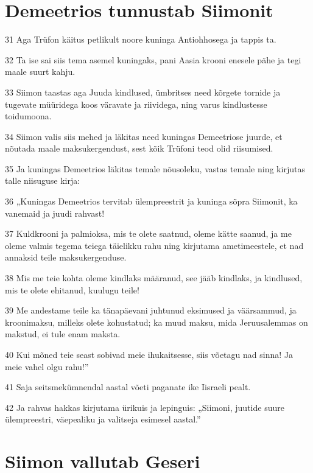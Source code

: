 \section*{Demeetrios tunnustab Siimonit}

\par 31 Aga Trüfon käitus petlikult noore kuninga Antiohhosega ja tappis ta.
\par 32 Ta ise sai siis tema asemel kuningaks, pani Aasia krooni enesele pähe ja tegi maale suurt kahju.
\par 33 Siimon taastas aga Juuda kindlused, ümbritses need kõrgete tornide ja tugevate müüridega koos väravate ja riividega, ning varus kindlustesse toidumoona.
\par 34 Siimon valis siis mehed ja läkitas need kuningas Demeetriose juurde, et nõutada maale maksukergendust, sest kõik Trüfoni teod olid riisumised.
\par 35 Ja kuningas Demeetrios läkitas temale nõusoleku, vastas temale ning kirjutas talle niisuguse kirja:
\par 36 „Kuningas Demeetrios tervitab ülempreestrit ja kuninga sõpra Siimonit, ka vanemaid ja juudi rahvast!
\par 37 Kuldkrooni ja palmioksa, mis te olete saatnud, oleme kätte saanud, ja me oleme valmis tegema teiega täielikku rahu ning kirjutama ametimeestele, et nad annaksid teile maksukergenduse.
\par 38 Mis me teie kohta oleme kindlaks määranud, see jääb kindlaks, ja kindlused, mis te olete ehitanud, kuulugu teile!
\par 39 Me andestame teile ka tänapäevani juhtunud eksimused ja väärsammud, ja kroonimaksu, milleks olete kohustatud; ka muud maksu, mida Jeruusalemmas on makstud, ei tule enam maksta.
\par 40 Kui mõned teie seast sobivad meie ihukaitsesse, siis võetagu nad sinna! Ja meie vahel olgu rahu!”
\par 41 Saja seitsmekümnendal aastal võeti paganate ike Iisraeli pealt.
\par 42 Ja rahvas hakkas kirjutama ürikuis ja lepinguis: „Siimoni, juutide suure ülempreestri, väepealiku ja valitseja esimesel aastal.” 

\section*{Siimon vallutab Geseri}

